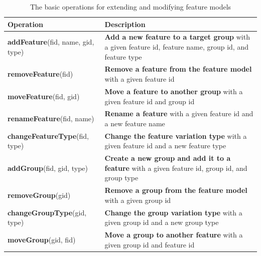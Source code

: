 \documentclass[a4paper,english]{ifimaster}
\begin{document}
\begin{table}
  \begin{tabularx}{\textwidth}{|l|X|}
		\hline
		\textbf{Operation} & \textbf{Description} \\
		\hline
		\textbf{addFeature}(fid, name, gid, type) &  \textbf{Add a new feature to a target group} \newline with a given feature id, \newline feature name, group id, \newline and feature type \\
		\hline
		\textbf{removeFeature}(fid) & \textbf{Remove a feature from the feature \newline model} \newline with a given feature id \\
		\hline
		\textbf{moveFeature}(fid, gid) & \textbf{Move a feature to another group} \newline with a given feature id and group id \\
		\hline
		\textbf{renameFeature}(fid, name) & \textbf{Rename a feature} \newline with a given feature id and a new \newline feature name \\
		\hline
		\textbf{changeFeatureType}(fid, type) & \textbf{Change the feature variation type} \newline with a given feature id and  a new \newline feature type \\
		\hline
		\textbf{addGroup}(fid, gid, type) & \textbf{Create a new group and add it \newline to a feature}  \newline with a given feature id, group id, \newline and group type \\ %
		\hline
		\textbf{removeGroup}(gid) & \textbf{Remove a group from the feature \newline model} \newline with a given group id \\
		\hline
		\textbf{changeGroupType}(gid, type) & \textbf{Change the group variation type} \newline with a given group id and a new \newline group type \\
		\hline
		\textbf{moveGroup}(gid, fid) & \textbf{Move a group to another feature} \newline with a given group id and feature id \\
		\hline
	\end{tabularx}
	\caption{The basic operations for extending and modifying feature models}
	\label{table:operations}
\end{table}
\end{document}
